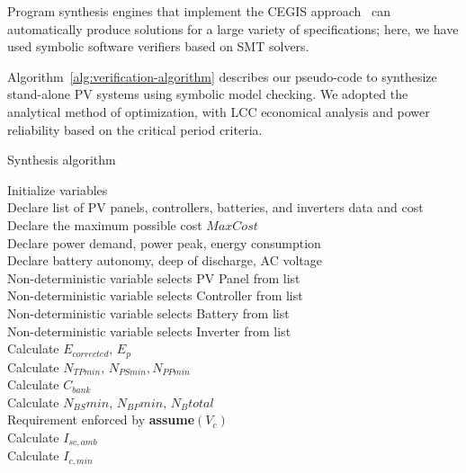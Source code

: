 \documentclass[journal]{IEEEtran}
\begin{document}
Program synthesis engines that implement the CEGIS approach~\cite{sketch} can automatically produce solutions for a large variety of specifications; here, we have used symbolic software verifiers based on SMT solvers.

Algorithm~\ref{alg:verification-algorithm} describes our pseudo-code to synthesize stand-alone PV systems using symbolic model checking. We adopted the analytical method of optimization, with LCC economical analysis and power reliability based on the critical period criteria.
%
 \begin{algorithm}
 \caption{Synthesis algorithm}
 \begin{algorithmic}[1]
 \renewcommand{\algorithmicrequire}{\textbf{Input:}}
 \renewcommand{\algorithmicensure}{\textbf{Output:}}
  \STATE Initialize variables \\
  \STATE Declare list of PV panels, controllers, batteries, and inverters data and cost \\
  \STATE Declare the maximum possible cost $MaxCost$  \\
  \STATE Declare power demand, power peak, energy consumption \\
  \STATE Declare battery autonomy, deep of discharge, AC voltage \\
 	\STATE Non-deterministic variable selects PV Panel from list \\
 	\STATE Non-deterministic variable selects Controller from list \\
 	\STATE Non-deterministic variable selects Battery from list \\
 	\STATE Non-deterministic variable selects Inverter from list \\ 	
 	\STATE Calculate $E_{corrected}, \, E_{p} $ \\
	\STATE Calculate $N_{TPmin}, \, N_{PSmin}, N_{PPmin} $ \\
 	\STATE Calculate $C_{bank}$ \\
	\STATE Calculate $N_{BS}min, \, N_{BP}min, \, N_{B}total$ \\
	\STATE Requirement enforced by \textbf{assume}$(V_{c})$ \\
 	\STATE Calculate $I_{sc,amb}$ \\
 	\STATE Calculate $I_{c,min}$ \\

\end{algorithmic}
\end{algorithm}
\end{document}
